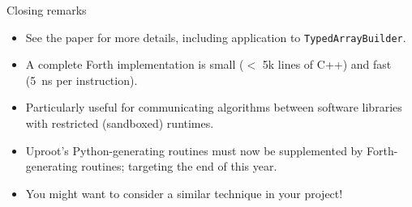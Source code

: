 \documentclass[aspectratio=169]{beamer}
\begin{document}
\begin{frame}{Closing remarks}
\Large
\vspace{0.25 cm}
\begin{itemize}[<+-|alert@+>]\setlength{\itemsep}{0.2 cm}
\item See the paper for more details, including application to \texttt{TypedArrayBuilder}.
\item A complete Forth implementation is small ($<$ 5k lines of C++) and fast (5~ns per instruction).
\item Particularly useful for communicating algorithms between software libraries with restricted (sandboxed) runtimes.
\item Uproot's Python-generating routines must now be supplemented by Forth-generating routines; targeting the end of this year.
\item You might want to consider a similar technique in your project!
\end{itemize}
\end{frame}
\end{document}

